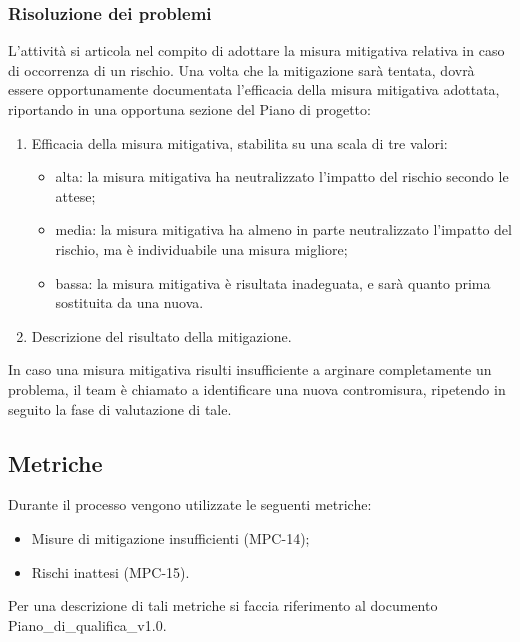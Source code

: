 \subsubsection{Risoluzione dei problemi}
L'attività si articola nel compito di adottare la misura mitigativa relativa in caso di occorrenza di un rischio. Una volta che la mitigazione sarà tentata, dovrà essere opportunamente documentata l'efficacia della misura mitigativa adottata, riportando in una opportuna sezione del Piano di progetto:
\begin{enumerate}
    \item Efficacia della misura mitigativa, stabilita su una scala di tre valori:
    \begin{itemize}
        \item alta: la misura mitigativa ha neutralizzato l'impatto del rischio secondo le attese;
        \item media: la misura mitigativa ha almeno in parte neutralizzato l'impatto del rischio, ma è individuabile una misura migliore;
        \item bassa: la misura mitigativa è risultata inadeguata, e sarà quanto prima sostituita da una nuova.
    \end{itemize}
    \item Descrizione del risultato della mitigazione.
\end{enumerate}
In caso una misura mitigativa risulti insufficiente a arginare completamente un problema, il team è chiamato a identificare una nuova contromisura, ripetendo in seguito la fase di valutazione di tale.
\subsection{Metriche}
Durante il processo vengono utilizzate le seguenti metriche:
\begin{itemize}
    \item Misure di mitigazione insufficienti (MPC-14);
    \item Rischi inattesi (MPC-15).
\end{itemize}
Per una descrizione di tali metriche si faccia riferimento al documento Piano\_di\_qualifica\_v1.0.
